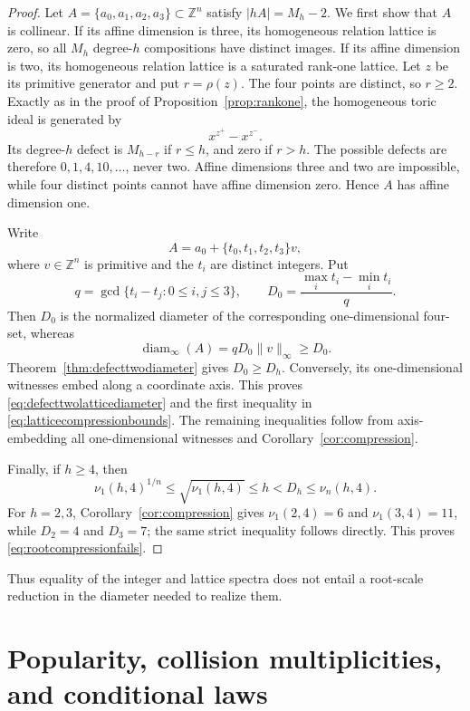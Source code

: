\documentclass[11pt,reqno]{amsart}
\theoremstyle{definition}
\theoremstyle{remark}
\newcommand{\Z}{\mathbb Z}
\begin{document}
\begin{proof}
Let $A=\{a_0,a_1,a_2,a_3\}\subset\Z^n$ satisfy $|hA|=M_h-2$.
We first show that $A$ is collinear.  If its affine dimension is three,
its homogeneous relation lattice is zero, so all $M_h$ degree-$h$
compositions have distinct images.  If its affine dimension is two, its
homogeneous relation lattice is a saturated rank-one lattice.  Let $z$ be
its primitive generator and put $r=\rho(z)$.  The four points are distinct,
so $r\geq2$.  Exactly as in the proof of
Proposition~\ref{prop:rankone}, the homogeneous toric ideal is generated by
\[
 x^{z^+}-x^{z^-}.
\]
Its degree-$h$ defect is $M_{h-r}$ if $r\leq h$, and zero if $r>h$.
The possible defects are therefore $0,1,4,10,\ldots$, never two.  Affine
dimensions three and two are impossible, while four distinct points cannot
have affine dimension zero.  Hence $A$ has affine dimension one.

Write
\[
 A=a_0+\{t_0,t_1,t_2,t_3\}v,
\]
where $v\in\Z^n$ is primitive and the $t_i$ are distinct integers.  Put
\[
 q=\gcd\{t_i-t_j:0\leq i,j\leq3\},\qquad
 D_0=\frac{\max_i t_i-\min_i t_i}{q}.
\]
Then $D_0$ is the normalized diameter of the corresponding
one-dimensional four-set, whereas
\begin{equation}\label{eq:collinearnormalization}
 \operatorname{diam}_\infty(A)
 =qD_0\lVert v\rVert_\infty\geq D_0.
\end{equation}
Theorem~\ref{thm:defecttwodiameter} gives $D_0\geq D_h$.
Conversely, its one-dimensional witnesses embed along a coordinate axis.
This proves \eqref{eq:defecttwolatticediameter} and the first inequality in
\eqref{eq:latticecompressionbounds}.  The remaining inequalities follow
from axis-embedding all one-dimensional witnesses and
Corollary~\ref{cor:compression}.

Finally, if $h\geq4$, then
\[
 \nu_1(h,4)^{1/n}\leq\sqrt{\nu_1(h,4)}
 \leq h<D_h\leq\nu_n(h,4).
\]
For $h=2,3$, Corollary~\ref{cor:compression} gives
$\nu_1(2,4)=6$ and $\nu_1(3,4)=11$, while $D_2=4$ and $D_3=7$;
the same strict inequality follows directly.
This proves \eqref{eq:rootcompressionfails}.
\end{proof}

Thus equality of the integer and lattice spectra does not entail a
root-scale reduction in the diameter needed to realize them.

\section{Popularity, collision multiplicities, and conditional laws}
\label{sec:popularity}
\end{document}
